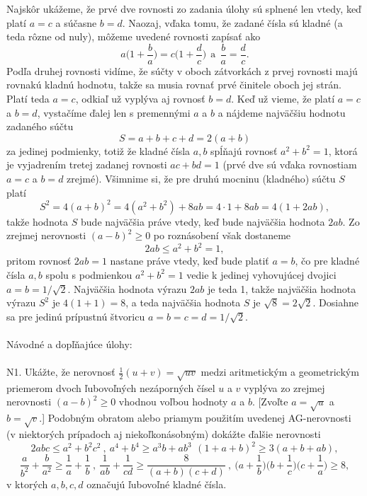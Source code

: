 \rie Najskôr ukážeme, že prvé dve rovnosti zo zadania úlohy sú splnené len vtedy, keď platí $a = c$ a súčasne $b = d$. Naozaj, vďaka tomu, že zadané čísla sú kladné (a teda rôzne od nuly), môžeme uvedené rovnosti zapísať ako
$$ a \bigg( 1+\frac{b}{a}\bigg) = c\bigg(1+\frac{d}{c}\bigg) \ \ \mathrm{a} \ \ \frac{b}{a}=\frac{d}{c}.$$
Podľa druhej rovnosti vidíme, že súčty v oboch zátvorkách z prvej rovnosti majú rovnakú kladnú hodnotu, takže sa musia rovnať prvé činitele oboch jej strán. Platí teda $a = c$, odkiaľ už vyplýva aj rovnosť $b = d$.
Keď už vieme, že platí $a = c$ a $b = d$, vystačíme ďalej len s premennými $a$ a $b$ a nájdeme najväčšiu hodnotu zadaného súčtu
$$S = a + b + c + d = 2(a + b)$$
za jedinej podmienky, totiž že kladné čísla $a, b$ spĺňajú rovnosť $a^2 + b^2 = 1$, ktorá je
vyjadrením tretej zadanej rovnosti $ac + bd = 1$ (prvé dve sú vďaka rovnostiam $a = c$ a $b = d$ zrejmé).
Všimnime si, že pre druhú mocninu (kladného) súčtu $S$ platí
$$S^2= 4(a + b)^2= 4(a^2+ b^2) + 8ab = 4 \cdot 1 + 8ab = 4(1 + 2ab),$$
takže hodnota $S$ bude najväčšia práve vtedy, keď bude najväčšia hodnota $2ab$. Zo zrejmej nerovnosti $(a - b)^2\geq 0$ po roznásobení však dostaneme
$$2ab \leq a^2+ b^2= 1,$$
pritom rovnosť $2ab = 1$ nastane práve vtedy, keď bude platiť $a = b$, čo pre kladné čísla $a, b$ spolu s podmienkou $a^2 + b^2 = 1$ vedie k jedinej vyhovujúcej dvojici $a = b = 1/\sqrt{2}$. Najväčšia hodnota výrazu $2ab$ je teda 1, takže najväčšia hodnota výrazu $S^2$ je $4(1 + 1) = 8$, a teda najväčšia hodnota $S$ je $\sqrt{8} = 2\sqrt{2}$. Dosiahne sa pre jedinú prípustnú štvoricu $a = b = c = d = 1/\sqrt{2}$.\\
\\
Návodné a dopľňajúce úlohy:\\
\\
N1. Ukážte, že nerovnosť $\frac{1}{2} (u + v) = \sqrt{uv}$ medzi aritmetickým a geometrickým priemerom
dvoch ľubovoľných nezáporných čísel $u$ a $v$ vyplýva zo zrejmej nerovnosti $(a - b)^2\geq 0$ vhodnou voľbou hodnoty $a$ a $b$. [Zvoľte $a =\sqrt{u}$ a $b =\sqrt{v}$.] Podobným obratom alebo priamym použitím uvedenej AG-nerovnosti (v niektorých prípadoch aj niekoľkonásobným) dokážte ďalšie nerovnosti $$2abc \leq a^2+ b^2c^2 \ , \ a^4+ b^4 \geq a^3b + ab^3 \, \ (1 + a + b)^2 \geq 3(a + b + ab),$$
$$\frac{a}{b^2}+\frac{b}{a^2}\geq \frac{1}{a}+\frac{1}{b}\ , \ \frac{1}{ab}+\frac{1}{cd} \geq \frac{8}{(a+b)(c+d)}\ , \ \bigg(a+\frac{1}{b} \bigg) \bigg( b+\frac{1}{c} \bigg) \bigg( c+\frac{1}{a}\bigg) \geq 8,$$
v ktorých $a, b, c, d$ označujú ľubovoľné kladné čísla.\\

